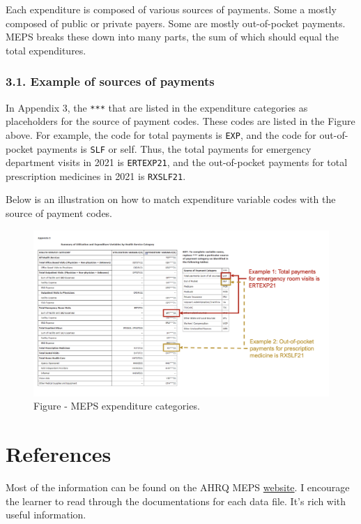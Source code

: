 \documentclass[
]{book}
\begin{document}
Each expenditure is composed of various sources of payments. Some a mostly composed of public or private payers. Some are mostly out-of-pocket payments. MEPS breaks these down into many parts, the sum of which should equal the total expenditures.

\hypertarget{example-of-sources-of-payments}{%
\subsubsection{3.1. Example of sources of payments}\label{example-of-sources-of-payments}}

In Appendix 3, the \texttt{***} that are listed in the expenditure categories as placeholders for the source of payment codes. These codes are listed in the Figure above. For example, the code for total payments is \texttt{EXP}, and the code for out-of-pocket payments is \texttt{SLF} or self. Thus, the total payments for emergency department visits in 2021 is \texttt{ERTEXP21}, and the out-of-pocket payments for total prescription medicines in 2021 is \texttt{RXSLF21}.

Below is an illustration on how to match expenditure variable codes with the source of payment codes.

\begin{figure}
\includegraphics[width=1\linewidth]{Figure 7_3 - MEPS - codes files match} \caption{Figure - MEPS expenditure categories.}\label{fig:unnamed-chunk-99}
\end{figure}

\hypertarget{references}{%
\section{References}\label{references}}

Most of the information can be found on the AHRQ MEPS \href{https://meps.ahrq.gov/mepsweb/}{website}. I encourage the learner to read through the documentations for each data file. It's rich with useful information.
\end{document}
